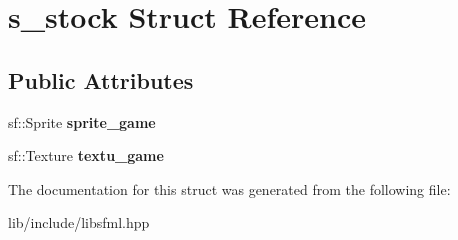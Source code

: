 \section{s\+\_\+stock Struct Reference}
\label{structs__stock}
\subsection*{Public Attributes}
\begin{DoxyCompactItemize}
\item 
\mbox{\label{structs__stock_a75f91cfc81272ec7839adfa9317a5fc2}} 
sf\+::\+Sprite {\bfseries sprite\+\_\+game}
\item 
\mbox{\label{structs__stock_a9252a7d071788536be1d5110f6cdc9a0}} 
sf\+::\+Texture {\bfseries textu\+\_\+game}
\end{DoxyCompactItemize}


The documentation for this struct was generated from the following file\+:\begin{DoxyCompactItemize}
\item 
lib/include/libsfml.\+hpp\end{DoxyCompactItemize}
